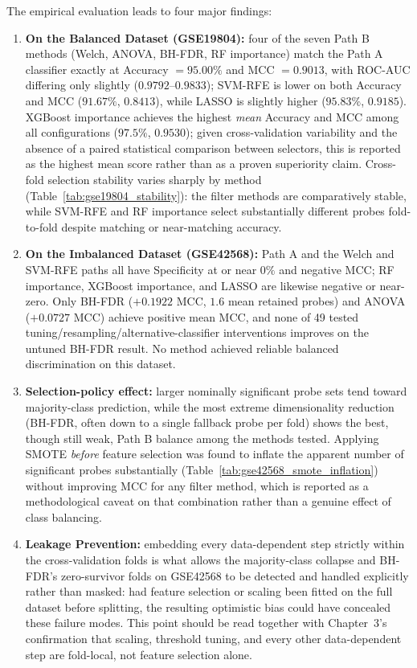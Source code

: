 The empirical evaluation leads to four major findings:
\begin{enumerate}
    \item \textbf{On the Balanced Dataset (GSE19804):} four of the seven Path B methods (Welch, ANOVA, BH-FDR, RF importance) match the Path A classifier exactly at Accuracy $=95.00\%$ and MCC $=0.9013$, with ROC-AUC differing only slightly ($0.9792$--$0.9833$); SVM-RFE is lower on both Accuracy and MCC ($91.67\%$, $0.8413$), while LASSO is slightly higher ($95.83\%$, $0.9185$). XGBoost importance achieves the highest \emph{mean} Accuracy and MCC among all configurations ($97.5\%$, $0.9530$); given cross-validation variability and the absence of a paired statistical comparison between selectors, this is reported as the highest mean score rather than as a proven superiority claim. Cross-fold selection stability varies sharply by method (Table~\ref{tab:gse19804_stability}): the filter methods are comparatively stable, while SVM-RFE and RF importance select substantially different probes fold-to-fold despite matching or near-matching accuracy.
    \item \textbf{On the Imbalanced Dataset (GSE42568):} Path A and the Welch and SVM-RFE paths all have Specificity at or near $0\%$ and negative MCC; RF importance, XGBoost importance, and LASSO are likewise negative or near-zero. Only BH-FDR ($+0.1922$ MCC, $1.6$ mean retained probes) and ANOVA ($+0.0727$ MCC) achieve positive mean MCC, and none of 49 tested tuning/resampling/alternative-classifier interventions improves on the untuned BH-FDR result. No method achieved reliable balanced discrimination on this dataset.
    \item \textbf{Selection-policy effect:} larger nominally significant probe sets tend toward majority-class prediction, while the most extreme dimensionality reduction (BH-FDR, often down to a single fallback probe per fold) shows the best, though still weak, Path B balance among the methods tested. Applying SMOTE \emph{before} feature selection was found to inflate the apparent number of significant probes substantially (Table~\ref{tab:gse42568_smote_inflation}) without improving MCC for any filter method, which is reported as a methodological caveat on that combination rather than a genuine effect of class balancing.
    \item \textbf{Leakage Prevention:} embedding every data-dependent step strictly within the cross-validation folds is what allows the majority-class collapse and BH-FDR's zero-survivor folds on GSE42568 to be detected and handled explicitly rather than masked: had feature selection or scaling been fitted on the full dataset before splitting, the resulting optimistic bias could have concealed these failure modes. This point should be read together with Chapter~3's confirmation that scaling, threshold tuning, and every other data-dependent step are fold-local, not feature selection alone.
\end{enumerate}

